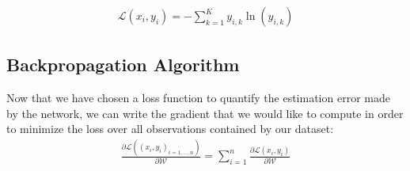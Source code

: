\documentclass{article}
\begin{document}
\begin{align*}
    \mathcal{L}(x_i, y_i) = -\sum_{k=1}^K y_{i,k}\ln (\hat{y}_{i, k})
\end{align*}


\subsection{Backpropagation Algorithm}


\noindent Now that we have chosen a loss function to quantify the estimation error made by the network,
we can write the gradient that we would like to compute in order to minimize the loss over all observations
contained by our dataset:
\begin{align*}
    \frac{\partial \mathcal{L}((x_i, y_i)_{i=1, ..., n})}{\partial \mathcal{W}} = 
    \sum_{i=1}^n \frac{\partial \mathcal{L}(x_i, y_i)}{\partial \mathcal{W}} 
\end{align*}
\end{document}
